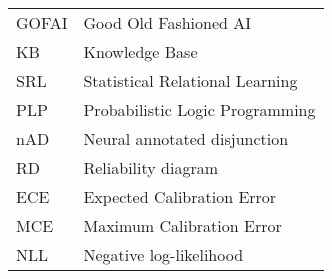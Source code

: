 \begin{flushleft}
\renewcommand{\arraystretch}{1.1}
\begin{tabularx}{\textwidth}{@{}p{12mm}X@{}}
GOFAI & Good Old Fashioned AI \\
KB & Knowledge Base \\
SRL & Statistical Relational Learning \\
PLP & Probabilistic Logic Programming \\
nAD & Neural annotated disjunction \\
RD & Reliability diagram \\
ECE & Expected Calibration Error \\
MCE & Maximum Calibration Error \\
NLL & Negative log-likelihood
\end{tabularx}
\end{flushleft}